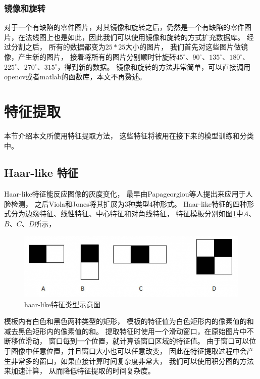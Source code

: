 \subsubsection{镜像和旋转}

对于一个有缺陷的零件图片，对其镜像和旋转之后，仍然是一个有缺陷的零件图片，在法线图上也是如此，因此我们可以使用镜像和旋转的方式扩充数据库。
经过分割之后，
所有的数据都变为$25*25$大小的图片，
我们首先对这些图片做镜像，产生新的图片，
接着将所有的图片分别顺时针旋转$45^\circ$、$90^\circ$、$135^\circ$、$180^\circ$、$225^\circ$、$270^\circ$、$315^\circ$，得到新的数据。
镜像和旋转的方法非常简单，可以直接调用opencv\cite{opencv_library}或者matlab\cite{MATLAB:2017}的函数库，本文不再赘述。

\section{特征提取}
\label{section:tezhengtiqu}

本节介绍本文所使用特征提取方法，
这些特征将被用在接下来的模型训练和分类中。

\subsection{Haar-like 特征}

Haar-like特征能反应图像的灰度变化，
最早由Papageorgiou等人提出来应用于人脸检测，
之后Viola和Jones\cite{viola2001rapid}将其扩展为3种类型4种形式。
Haar-like特征的四种形式分为边缘特征、线性特征、中心特征和对角线特征，
特征模板分别如图\ref{fig:haar-like}中$A$、$B$、$C$、$D$所示，
\begin{figure}[htbp]
\centering
\includegraphics[width=1.0\linewidth]{figures/haarlike.png}
\caption{haar-like特征类型示意图}
\label{fig:haar-like}
\end{figure}
模板内有白色和黑色两种类型的矩形，
模板的特征值为白色矩形内的像素值的和减去黑色矩形内的像素值的和。
提取特征时使用一个滑动窗口，在原始图片中不断移位滑动，
窗口每到一个位置，就计算该窗口区域的特征值。
由于窗口可以位于图像中任意位置，并且窗口大小也可以任意改变，
因此在特征提取过程中会产生非常多的窗口，如果直接计算时间复杂度非常大，
我们可以使用积分图的方法来加速计算，
从而降低特征提取的时间复杂度。

